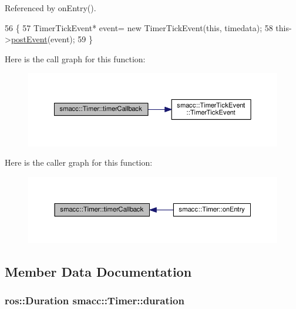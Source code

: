 Referenced by on\+Entry().


\begin{DoxyCode}
56   \{
57     TimerTickEvent* \textcolor{keyword}{event}= \textcolor{keyword}{new} TimerTickEvent(\textcolor{keyword}{this}, timedata);
58     this->\hyperlink{classsmacc_1_1SmaccSubStateBehavior_a8538664f9828247727a27446112788a2}{postEvent}(event);
59   \}   
\end{DoxyCode}


Here is the call graph for this function\+:
\nopagebreak
\begin{figure}[H]
\begin{center}
\leavevmode
\includegraphics[width=350pt]{classsmacc_1_1Timer_a3939cbeb19e5a7d9c02c56064805b242_cgraph}
\end{center}
\end{figure}




Here is the caller graph for this function\+:
\nopagebreak
\begin{figure}[H]
\begin{center}
\leavevmode
\includegraphics[width=350pt]{classsmacc_1_1Timer_a3939cbeb19e5a7d9c02c56064805b242_icgraph}
\end{center}
\end{figure}




\subsection{Member Data Documentation}
\subsubsection[{\texorpdfstring{duration}{duration}}]{\setlength{\rightskip}{0pt plus 5cm}ros\+::\+Duration smacc\+::\+Timer\+::duration}\hypertarget{classsmacc_1_1Timer_a564c0bbd2b12909d61a1345358c641fc}{}\label{classsmacc_1_1Timer_a564c0bbd2b12909d61a1345358c641fc}


